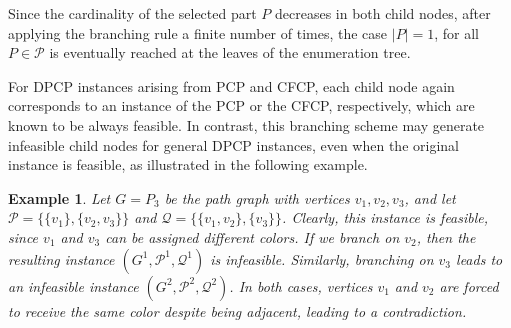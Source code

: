 \documentclass[preprint, 11pt, authoryear]{elsarticle}
\newtheorem{example}{Example}[section]
\newcommand{\PP}{{\mathcal P}}
\newcommand{\QQ}{{\mathcal Q}}
\newcommand{\card}[1]{\left| #1 \right|}
\begin{document}

Since the cardinality of the selected part $P$ decreases in both child nodes, after applying the branching rule a finite number of times, the case $\card{P}=1$, for all $P\in\PP$ is eventually reached at the leaves of the enumeration tree.



For DPCP instances arising from PCP and CFCP,  each child node again corresponds to an instance of the PCP or the CFCP, respectively, which are known to be always feasible.
In contrast, this branching scheme may generate infeasible child nodes for general DPCP instances, even when the original instance is feasible, as illustrated in the following example.
\begin{example}\label{example:infeasible:branch}
Let $G=P_3$ be the path graph with vertices $v_1,v_2,v_3$, and let 
$\PP=\{\{v_1\},\{v_2,v_3\}\}$ and 
$\QQ=\{\{v_1,v_2\},\{v_3\}\}$.
Clearly, this instance is feasible, since $v_1$ and $v_3$ can be assigned different colors.
If we branch on $v_2$, then the resulting instance $(G^1,\PP^1,\QQ^1)$ is infeasible.
Similarly, branching on $v_3$ leads to an infeasible instance $(G^2,\PP^2,\QQ^2)$.
In both cases, vertices $v_1$ and $v_2$ are forced to receive the same color despite being adjacent, leading to a contradiction.
\end{example}

\end{document}
